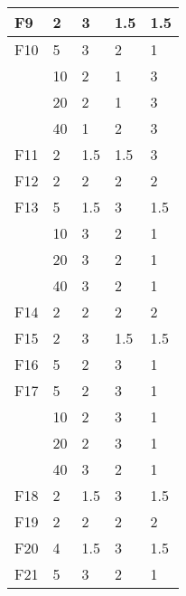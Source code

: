 \begin{longtable}{|l|l|l|l|l|}
F9           & 2   & 3    & 1.5              & 1.5              \\ \midrule
F10          & 5   & 3    & 2                & 1                \\ \cmidrule{2-5}
             & 10  & 2    & 1                & 3                \\ \cmidrule{2-5}
             & 20  & 2    & 1                & 3                \\ \cmidrule{2-5}
             & 40  & 1    & 2                & 3                \\ \midrule
F11          & 2   & 1.5  & 1.5              & 3                \\ \midrule
F12          & 2   & 2    & 2                & 2                \\ \midrule
F13          & 5   & 1.5  & 3                & 1.5              \\ \midrule
             & 10  & 3    & 2                & 1                \\ \cmidrule{2-5}
             & 20  & 3    & 2                & 1                \\ \cmidrule{2-5}
             & 40  & 3    & 2                & 1                \\ \midrule
F14          & 2   & 2    & 2                & 2                \\ \midrule
F15          & 2   & 3    & 1.5              & 1.5              \\ \midrule
F16          & 5   & 2    & 3                & 1                \\ \midrule
F17          & 5   & 2    & 3                & 1                \\ \cmidrule{2-5}
             & 10  & 2    & 3                & 1                \\ \cmidrule{2-5}
             & 20  & 2    & 3                & 1                \\ \cmidrule{2-5}
             & 40  & 3    & 2                & 1                \\ \midrule
F18          & 2   & 1.5  & 3                & 1.5              \\ \midrule
F19          & 2   & 2    & 2                & 2                \\ \midrule
F20          & 4   & 1.5  & 3                & 1.5              \\ \midrule
F21          & 5   & 3    & 2                & 1                \\ \cmidrule{2-5}

\end{longtable}
